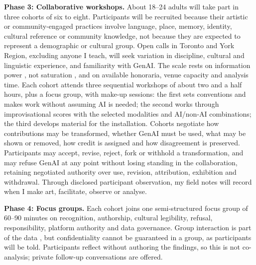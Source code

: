 \textbf{Phase 3: Collaborative workshops.} About 18--24 adults will take part
in three cohorts of six to eight. Participants will be recruited because
their artistic or community-engaged practices involve language, place,
memory, identity, cultural reference or community knowledge, not because
they are expected to represent a demographic or cultural group. Open calls
in Toronto and York Region, excluding anyone I teach, will seek variation in
discipline, cultural and linguistic experience, and familiarity with GenAI.
The scale rests on information power \citep{malterud2016}, not
saturation \citep{braun2021saturate}, and on available honoraria, venue
capacity and analysis time. Each cohort attends three sequential workshops
of about two and a half hours, plus a focus group, with make-up sessions:
the first sets conventions and makes work without assuming AI is needed; the
second works through improvisational scores with the selected modalities
and AI/non-AI combinations; the third develops material for the
installation. Cohorts negotiate how contributions may be transformed,
whether GenAI must be used, what may be shown or removed, how credit is
assigned and how disagreement is preserved. Participants may accept, revise,
reject, fork or withhold a transformation, and may refuse GenAI at any point
without losing standing in the collaboration, retaining negotiated authority
over use, revision, attribution, exhibition and withdrawal. Through
disclosed participant observation, my field notes will record when I make
art, facilitate, observe or analyse.

\textbf{Phase 4: Focus groups.} Each cohort joins one semi-structured focus
group of 60--90 minutes on recognition, authorship, cultural legibility,
refusal, responsibility, platform authority and data governance. Group interaction is part of the data \citep{kitzinger1994}, but
confidentiality cannot be guaranteed in a group, as participants will be
told. Participants reflect without authoring the findings, so this is not
co-analysis; private follow-up conversations are offered.


